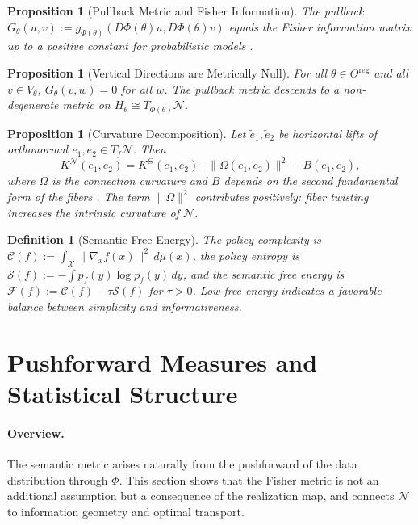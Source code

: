 \documentclass[twocolumn,10pt]{article}
\theoremstyle{thmstyle}
\newtheorem{proposition}[theorem]{Proposition}
\theoremstyle{defstyle}
\newtheorem{definition}[theorem]{Definition}
\begin{document}
\begin{proposition}[Pullback Metric and Fisher Information]
The pullback $G_\theta(u,v) := g_{\Phi(\theta)}(D\Phi(\theta)u,
D\Phi(\theta)v)$ equals the Fisher information matrix up to a positive
constant for probabilistic models \citep{amari1998natural}.
\end{proposition}

\begin{proposition}[Vertical Directions are Metrically Null]
For all $\theta \in \Theta^{\mathrm{reg}}$ and all $v \in V_\theta$,
$G_\theta(v,w) = 0$ for all $w$. The pullback metric descends to a
non-degenerate metric on $H_\theta \cong T_{\Phi(\theta)}\mathcal{N}$.
\end{proposition}

\begin{proposition}[Curvature Decomposition]
\label{prop:curvature-decomp}
Let $\tilde e_1, \tilde e_2$ be horizontal lifts of orthonormal
$e_1, e_2 \in T_f\mathcal{N}$. Then
\[
K^{\mathcal{N}}(e_1,e_2) = K^\Theta(\tilde e_1,\tilde e_2)
+ \|\Omega(\tilde e_1,\tilde e_2)\|^2 - B(\tilde e_1,\tilde e_2),
\]
where $\Omega$ is the connection curvature and $B$ depends on the
second fundamental form of the fibers
\citep{oneill1966fundamental}. The term $\|\Omega\|^2$ contributes
positively: fiber twisting increases the intrinsic curvature of
$\mathcal{N}$.
\end{proposition}

\begin{definition}[Semantic Free Energy]
\label{def:free-energy}
The \emph{policy complexity} is
$\mathcal{C}(f) := \int_\mathcal{X}\|\nabla_x f(x)\|^2\,d\mu(x)$,
the \emph{policy entropy} is
$\mathcal{S}(f) := -\int p_f(y)\log p_f(y)\,dy$, and the
\emph{semantic free energy} is
$\mathcal{F}(f) := \mathcal{C}(f) - \tau\mathcal{S}(f)$ for $\tau > 0$.
Low free energy indicates a favorable balance between simplicity and
informativeness.
\end{definition}

\section{Pushforward Measures and Statistical Structure}
\label{sec:pushforward}

\paragraph{Overview.}
The semantic metric arises naturally from the pushforward of the data
distribution through $\Phi$. This section shows that the Fisher metric
is not an additional assumption but a consequence of the realization map,
and connects $\mathcal{N}$ to information geometry and optimal transport.
\end{document}
